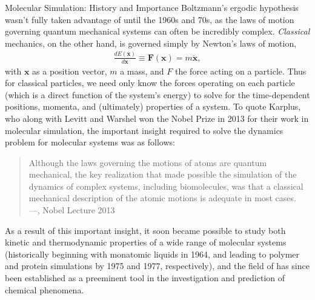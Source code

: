 \begin{section}{Molecular Simulation: History and Importance}
Boltzmann's ergodic hypothesis wasn't fully taken advantage of until the 1960s
and 70s, as the laws of motion governing quantum mechanical systems can often
be incredibly complex. \emph{Classical} mechanics, on the other hand, is
governed simply by Newton's laws of motion,
%
\begin{align}
\label{eq:intro-newton}
\frac{d E(\bm x)}{d \bm x} \equiv \bm F(\bm x) = m \ddot{\bm x}, 
\end{align}
%
with $\bm x$ as a position vector, $m$ a mass, and $F$ the force acting on a
particle. Thus for classical particles, we need only know the forces operating
on each particle (which is a direct function of the system's energy) to solve for the
time-dependent positions, momenta, and (ultimately) properties of a system.
To quote Karplus, who along with Levitt and Warshel won the Nobel Prize in
2013 for their work in molecular simulation, the important insight required to solve the dynamics
problem for molecular systems was as follows:
%
\begin{quote}
Although the laws governing the motions of atoms are quantum mechanical, the
key realization that made possible the simulation of the dynamics of complex
systems, including biomolecules, was that a classical mechanical description
of the atomic motions is adequate in most cases.
\\ \phantom{abc} \hfill
---\citet{Karplus2014}, Nobel Lecture 2013
\end{quote}
%
As a result of this important insight, it soon became possible to study both kinetic and
thermodynamic properties of a wide range of molecular systems (historically beginning with monatomic
liquids in 1964, and leading to polymer and protein simulations by 1975 and
1977, respectively),\cite{VanGunsteren1990} and the field of \md has since
been established as a preeminent tool in the investigation and prediction of chemical
phenomena.%


\end{section}
